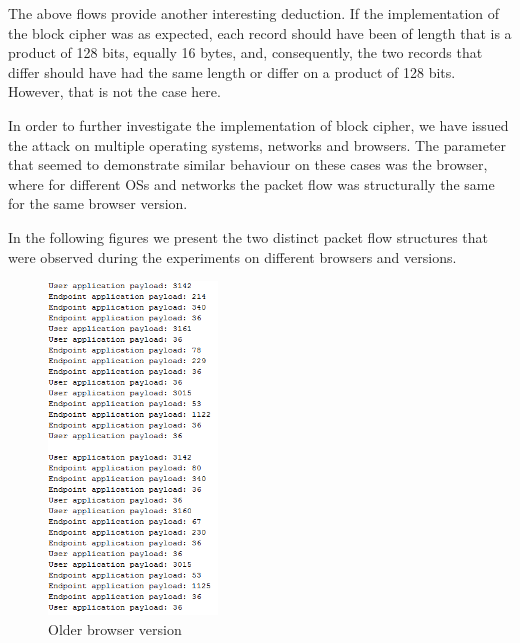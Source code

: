 The above flows provide another interesting deduction. If the implementation of
the block cipher was as expected, each record should have been of length that is
a product of 128 bits, equally 16 bytes, and, consequently, the two records that
differ should have had the same length or differ on a product of 128 bits.
However, that is not the case here.

In order to further investigate the implementation of block cipher, we have
issued the attack on multiple operating systems, networks and browsers. The
parameter that seemed to demonstrate similar behaviour on these cases was the
browser, where for different OSs and networks the packet flow was structurally
the same for the same browser version.

In the following figures we present the two distinct packet flow structures that
were observed during the experiments on different browsers and versions.

\begin{figure}[H] \caption{Older browser version} \centering
\includegraphics[width=0.4\textwidth]{diagrams/older_browser_version.png}\end{figure}

